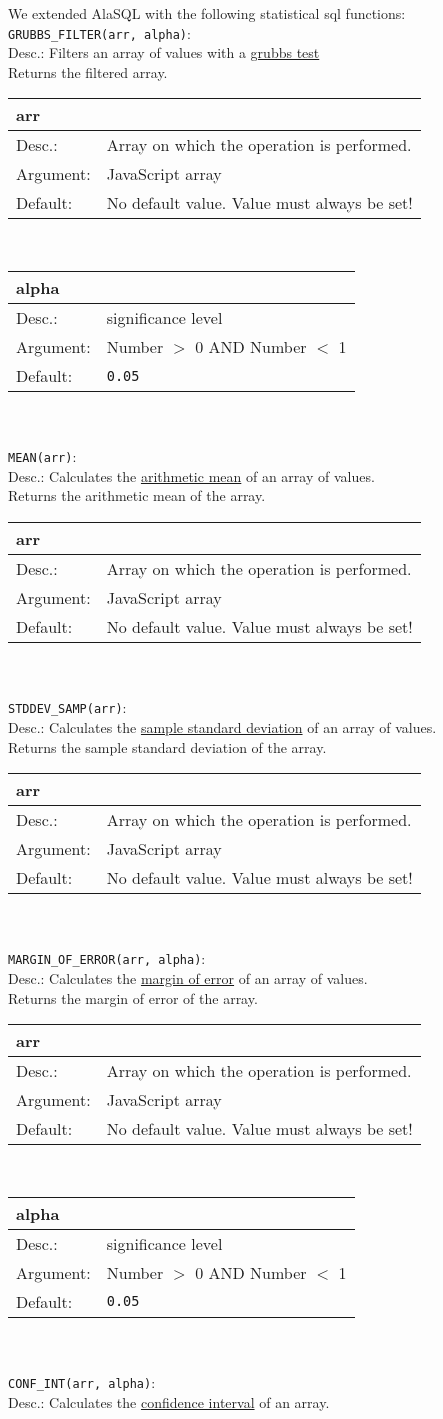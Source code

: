 \documentclass[11pt]{scrartcl}
\def\a{5cm}
\def\b{10.5cm}
\def\option#1#2#3#4{%
\noindent \begin{tabular}{|p{\a}|p{\b}|}
\hline
\textbf{#1} & \\
\hline
Desc.: & #2 \\
\hline
Argument: & #3\\
\hline
Default:& #4\\
\hline
\end{tabular} \\[4pt]%
}
\begin{document}
\noindent We extended AlaSQL with the following statistical sql functions:\\[5pt]
\verb|GRUBBS_FILTER(arr, alpha)|: \\
\indent Desc.: Filters an array of values with a \href{http://en.wikipedia.org/wiki/Grubbs'_test_for_outliers}{grubbs test}\\
\indent Returns the filtered array.\\[3pt]
\indent \option
{arr}
{Array on which the operation is performed.}
{JavaScript array}
{No default value. Value must always be set!}
\indent \option
{alpha}
{significance level}
{Number $>$ 0 AND Number $<$ 1}
{\texttt{0.05}}\\[3pt]
%
\verb|MEAN(arr)|: \\
\indent Desc.: Calculates the \href{http://en.wikipedia.org/wiki/Arithmetic_mean}{arithmetic mean} of an array of values.\\
\indent Returns the arithmetic mean of the array.\\[3pt]
\indent \option
{arr}
{Array on which the operation is performed.}
{JavaScript array}
{No default value. Value must always be set!}\\[3pt]
%
\verb|STDDEV_SAMP(arr)|: \\
\indent Desc.: Calculates the \href{http://en.wikipedia.org/wiki/Standard_deviation}{ sample standard deviation} of an array of values.\\
\indent Returns the sample standard deviation of the array.\\[3pt]
\indent \option
{arr}
{Array on which the operation is performed.}
{JavaScript array}
{No default value. Value must always be set!}\\[3pt]
%
\verb|MARGIN_OF_ERROR(arr, alpha)|: \\
\indent Desc.: Calculates the \href{http://en.wikipedia.org/wiki/Margin_of_error}{margin of error} of an array of values.\\
\indent Returns the margin of error of the array.\\[3pt]
\indent \option
{arr}
{Array on which the operation is performed.}
{JavaScript array}
{No default value. Value must always be set!}
\indent \option
{alpha}
{significance level}
{Number $>$ 0 AND Number $<$ 1}
{\texttt{0.05}}\\[3pt]
%
\verb|CONF_INT(arr, alpha)|: \\
\indent Desc.: Calculates the \href{http://en.wikipedia.org/wiki/Confidence_interval}{confidence interval} of an array.\\
\end{document}
